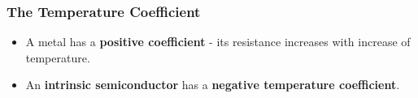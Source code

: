 \subsubsection*{The Temperature Coefficient}

\begin{itemize}
    \item A metal has a \textbf{positive coefficient} - its resistance increases with increase of temperature.
    \item An \textbf{intrinsic semiconductor} has a \textbf{negative temperature coefficient}.
\end{itemize}
